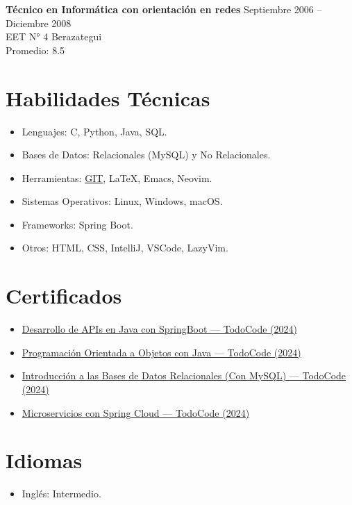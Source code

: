 \documentclass[a4paper,10pt]{article}
\begin{document}
\noindent \textbf{Técnico en Informática con orientación en redes} \hfill Septiembre 2006 – Diciembre 2008 \\
EET N° 4 \hfill Berazategui \\
Promedio: 8.5

\vspace{0.5cm}

\section*{Habilidades Técnicas}
\begin{itemize}
	\item Lenguajes: C, Python, Java, SQL.
	\item Bases de Datos: Relacionales (MySQL) y No Relacionales.
	\item Herramientas: \href{https://github.com/marcohc79} {GIT}, \LaTeX, Emacs, Neovim.
	\item Sistemas Operativos: Linux, Windows, macOS.
	\item Frameworks: Spring Boot.
	\item Otros: HTML, CSS, IntelliJ, VSCode, LazyVim.
\end{itemize}

\vspace{0.5cm}

\section*{Certificados}
\begin{itemize}
	\item \href{https://todocodeacademy.com/certificate/gav/}{Desarrollo de APIs en Java con SpringBoot — TodoCode (2024)}
	\item \href{https://todocodeacademy.com/certificate/siq/}{Programación Orientada a Objetos con Java — TodoCode (2024)}
	\item \href{https://todocodeacademy.com/certificate/uzh/}{Introducción a las Bases de Datos Relacionales (Con MySQL) — TodoCode (2024)}
	\item \href{https://todocodeacademy.com/certificate/lam/}{Microservicios con Spring Cloud — TodoCode (2024)}
\end{itemize}

\vspace{0.5cm}

\section*{Idiomas}
\begin{itemize}
	\item Inglés: Intermedio.
\end{itemize}

\vspace{0.5cm}
\end{document}
